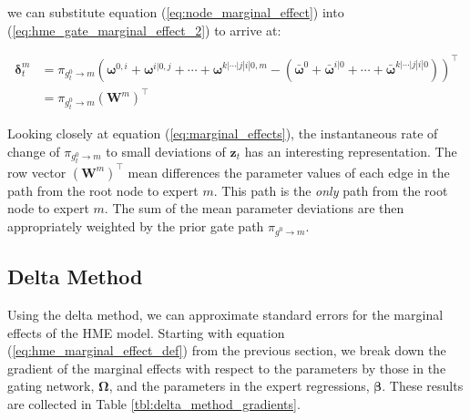 \documentclass[12pt]{article}
\newcommand{\mean}[1]{\bar{#1}}
\newcommand{\gateprod}[2]{\pi_{#1 \longrightarrow #2}}
\theoremstyle{definition}
\begin{document}
we can substitute equation (\ref{eq:node_marginal_effect}) into
(\ref{eq:hme_gate_marginal_effect_2}) to arrive at:

\begin{equation} \label{eq:marginal_effects}
  \begin{split}
    \boldsymbol{\delta}^{m}_{t} &= \gateprod{g^{0}_{t}}{m} \left(\boldsymbol{\omega}^{0, i} + \boldsymbol{\omega}^{i|0, j} + \cdots + \boldsymbol{\omega}^{k|\cdots|j|i|0, m} - \left( \mean{\boldsymbol{\omega}}^{0} + \mean{\boldsymbol{\omega}}^{i|0} + \cdots + \mean{\boldsymbol{\omega}}^{k|\cdots|j|i|0} \right) \right)^{\top} \\
                                &= \gateprod{g^{0}_{t}}{m} ( \boldsymbol{W}^{m} )^{\top}
  \end{split}
\end{equation}

Looking closely at equation (\ref{eq:marginal_effects}), the instantaneous rate
of change of $\gateprod{g^{0}_{t}}{m}$ to small deviations of $\boldsymbol{z}_{t}$
has an interesting representation. The row vector $( \boldsymbol{W}^{m} )^{\top}$
mean differences the parameter values of each edge in the path from the
root node to expert $m$. This path is the \textit{only} path from the root
node to expert $m$. The sum of the mean parameter deviations are then appropriately
weighted by the prior gate path $\gateprod{g^{0}}{m}$.


\subsection{Delta Method}

Using the delta method, we can approximate standard
errors for the marginal effects of the HME model. Starting with equation
(\ref{eq:hme_marginal_effect_def}) from the previous section, we break down
the gradient of the marginal effects with respect to the parameters by those 
in the gating network, $\boldsymbol{\Omega}$, and the parameters in the
expert regressions, $\boldsymbol{\beta}$. These results are collected in Table
 \ref{tbl:delta_method_gradients}.

 \bigskip
\end{document}
